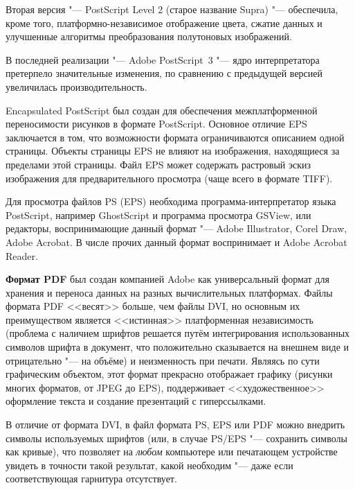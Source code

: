 Вторая версия "--- PostScript Level 2 (старое название Sup\-ra) "--- обеспечила, кроме того, платформно-независимое отображение цвета, сжатие данных и улучшенные алгоритмы преобразования полутоновых изображений.

В последней реализации "--- Adobe PostScript~3 "--- ядро интерпретатора претерпело значительные изменения, по сравнению с предыдущей версией увеличилась производительность.

Encapsulated PostScript был создан для обеспечения межплатформенной переносимости рисунков в формате PostScript. Основное отличие EPS заключается в том, что возможности формата ограничиваются описанием одной страницы. Объекты страницы EPS не влияют на изображения, находящиеся за пределами этой страницы. Файл EPS может содержать растровый эскиз изображения для предварительного просмотра (чаще всего в формате TIFF).

Для просмотра файлов PS (EPS) необходима программа-интерпретатор языка PostScript, например GhostScript и программа просмотра GSView, или редакторы, воспринимающие данный формат "--- Adobe Illustrator, Corel Draw, Adobe Acrobat. В числе прочих данный формат воспринимает и Adobe Acrobat Reader.

\textbf{Формат PDF} был создан компанией Adobe как универсальный формат для хранения и переноса данных на разных вычислительных платформах. Файлы формата PDF <<весят>> больше, чем файлы DVI, но основным их преимуществом является <<истинная>> платформенная независимость (проблема с наличием шрифтов решается путём интегрирования использованных символов шрифта в документ, что положительно сказывается на внешнем виде и отрицательно "--- на объёме) и неизменность при печати. Являясь по сути графическим объектом, этот формат прекрасно отображает графику (рисунки многих форматов, от JPEG до EPS), поддерживает <<художественное>> оформление текста и создание презентаций с гиперссылками.

В отличие от формата DVI, в файл формата PS, EPS или PDF можно внедрить символы используемых шрифтов (или, в случае PS/EPS "--- сохранить символы как кривые), что позволяет на \textit{любом} компьютере или печатающем устройстве увидеть в точности такой результат, какой необходим "--- даже если соответствующая гарнитура отсутствует.



\endinput
